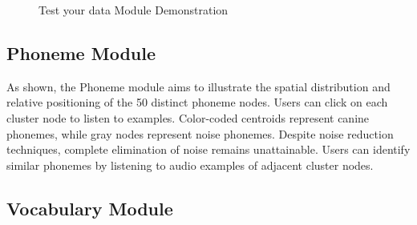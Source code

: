 \begin{figure}[th]
    \centering
    \caption{Test your data Module Demonstration}
    \label{fig:demo_t1}
\end{figure}

\subsection{Phoneme Module}

As  shown, the Phoneme module aims to illustrate the spatial distribution and relative positioning of the 50 distinct phoneme nodes. Users can click on each cluster node to listen to examples. Color-coded centroids represent canine phonemes, while gray nodes represent noise phonemes. Despite noise reduction techniques, complete elimination of noise remains unattainable. Users can identify similar phonemes by listening to audio examples of adjacent cluster nodes.

\subsection{Vocabulary Module}

